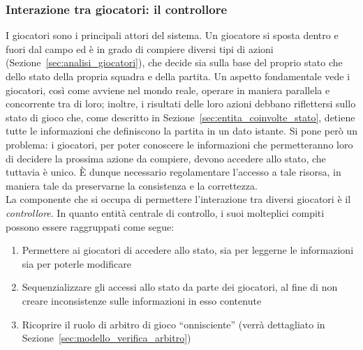 
%

\subsubsection{Interazione tra giocatori: il controllore}
\label{sec:modello_interazione_giocatori}

I giocatori sono i principali attori del sistema. Un giocatore si sposta dentro e fuori dal campo ed è in grado di compiere diversi tipi di azioni (Sezione~\ref{sec:analisi_giocatori}), che decide sia sulla base del proprio stato che dello stato della propria squadra e della partita. Un aspetto fondamentale vede i giocatori, così come avviene nel mondo reale, operare in maniera parallela e concorrente tra di loro; inoltre, i risultati delle loro azioni debbano riflettersi sullo stato di gioco che, come descritto in Sezione~\ref{sec:entita_coinvolte_stato}, detiene tutte le informazioni che definiscono la partita in un dato istante. Si pone però un problema: i giocatori, per poter conoscere le informazioni che permetteranno loro di decidere la prossima azione da compiere, devono accedere allo stato, che tuttavia è unico. È dunque necessario regolamentare l'accesso a tale risorsa, in maniera tale da preservarne la consistenza e la correttezza.\\

La componente che si occupa di permettere l'interazione tra diversi giocatori è il \textit{controllore}. In quanto entità centrale di controllo, i suoi molteplici compiti possono essere raggruppati come segue:

\begin{enumerate}
	\item Permettere ai giocatori di accedere allo stato, sia per leggerne le informazioni sia per poterle modificare
	\item Sequenzializzare gli accessi allo stato da parte dei giocatori, al fine di non creare inconsistenze sulle informazioni in esso contenute
	\item Ricoprire il ruolo di arbitro di gioco ``onnisciente'' (verrà dettagliato in Sezione~\ref{sec:modello_verifica_arbitro})
\end{enumerate}

